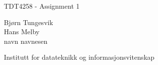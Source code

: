 \begin{titlepage}
    \begin{center}
      \large  
      
      \hfill
      
      \vfill
      
      \begingroup
      \LARGE TDT4258 - Assignment 1
      \bigskip
      \endgroup
      
      {\sc Bjørn Tungesvik}\\
      {\sc Hans Melby} \\
      {\sc navn navnesen}\\
      
      \vspace{12cm}

      Institutt for datateknikk og informasjonsvitenskap 
       
    \end{center}  
\end{titlepage}

